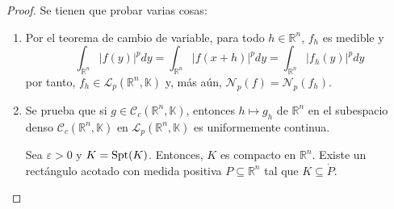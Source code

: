 \documentclass[12pt]{report}
\theoremstyle{largebreak}
\newcommand\abs[1]{\ensuremath{\big|#1\big|}}
\newcommand{\N}[2]{\ensuremath{\mathcal{N}_{#1}\left(#2\right)}}
\newcommand{\GenSpace}[4]{\ensuremath{\mathcal{#1}_{#2}\left(#3,#4\right)}}
\begin{document}
    \begin{proof}
        Se tienen que probar varias cosas:
        \begin{enumerate}
            \item Por el teorema de cambio de variable, para todo $h\in\mathbb{R}^n$, $f_h$ es medible y
            \begin{equation*}
                \int_{\mathbb{R}^n}\abs{f(y)}^pdy=\int_{\mathbb{R}^n}\abs{f(x+h)}^pdy=\int_{\mathbb{R}^n}\abs{f_h(y)}^pdy
            \end{equation*}
            por tanto, $f_h\in\mathcal{L}_p(\mathbb{R}^n,\mathbb{K})$ y, más aún, $\N{p}{f}=\N{p}{f_h}$.
            \item Se prueba que si $g\in\mathcal{C}_c(\mathbb{R}^n,\mathbb{K})$, entonces $h\mapsto g_h$ de $\mathbb{R}^n$ en el subespacio denso $\GenSpace{\mathcal{C}}{c}{\mathbb{R}^n}{\mathbb{K}}$ en $\mathcal{L}_p(\mathbb{R}^n,\mathbb{K})$ es uniformemente continua.
            
            Sea $\varepsilon>0$ y $K=\textup{Spt}(K)$. Entonces, $K$ es compacto en $\mathbb{R}^n$. Existe un rectángulo acotado con medida positiva $P\subseteq\mathbb{R}^n$ tal que $K\subseteq\mathring{P}$.


\end{enumerate}
\end{proof}
\end{document}
